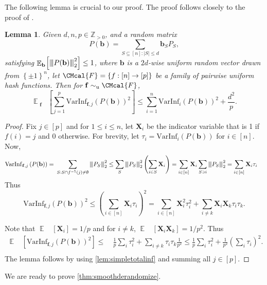 \documentclass[11pt]{article}
\def\F{\CMcal{F}}
\theoremstyle{plain}
\newtheorem{lemma}[theorem]{Lemma}
\theoremstyle{definition}
\newcommand {\minusspace} {\: \! \!}
\newcommand {\Fn} [2] {\ensuremath{ #1 \minusspace \Br{ #2 } }}
\newcommand {\set} [1] {\ensuremath{ \left\lbrace #1 \right\rbrace }}
\newcommand {\br} [1] {\ensuremath{ \left( #1 \right) }}
\newcommand {\Br} [1] {\ensuremath{ \left[ #1 \right] }}
\newcommand {\ab} [1] {\ensuremath{ \left| #1 \right| }}
\DeclareMathOperator*{\bigE}{\mathbb{E}}
\newcommand {\expec} [2] {\Fn{\bigE_{\substack{#1}}}{#2}}
\newcommand{\nnorm}[1]{{\left\vert\kern-0.25ex\left\vert\kern-0.25ex\left\vert #1
		\right\vert\kern-0.25ex\right\vert\kern-0.25ex\right\vert}}
\newcommand{\posint}{{\mathbb Z}_{>0}}
\newcommand{\randb}{\ensuremath{\mathbf{b}}}
\newcommand{\randf}{\ensuremath{\mathbf{f}}}
\newcommand{\randX}{\ensuremath{\mathbf{X}}}
\newcommand{\varinfi}[1]{\ensuremath{\mathrm{VarInf}_i}\br{#1}}
\newcommand{\infrfj}[1]{\ensuremath{\mathrm{VarInf}_{\randf,j}}\br{#1}}
\newcommand{\invf}[1]{\ensuremath{f^{-1}\br{#1}}}
\newcommand{\usim}{\ensuremath{\sim_{\mathrm{u}}}}
\newcommand{\1}{\mathbb{1}} %
\begin{document}
The following lemma is crucial to our proof. The proof follows closely to the proof of \cite[Lemma 5.4]{10.1145/1806689.1806749}.

\begin{lemma}\label{fact:totalinfsqr}
Given $d,n,p\in\posint$, and a random matrix
\[P(\randb)=\sum_{S\subseteq[n]:\ab{S}\leq d}\randb_SP_S,\]
satisfying $\expec{\randb}{\nnorm{P(\randb)}_2^2}\leq1$, 
where $\randb$ is a $2d$-wise uniform random vector drawn from $\set{\pm 1}^n$, let $\F=\set{f:[n]\to[p]}$ be a family of pairwise uniform hash functions. Then for $\randf\usim\F$,
\[\expec{\randf}{\sum_{j=1}^p\infrfj{P(\randb)}^2}\leq\sum_{i=1}^n\varinfi{P(\randb)}^2+\frac{d^2}{p}.\]
\end{lemma}

\begin{proof}
    Fix $j\in[p]$ and for $1\leq i\leq n$, let $\randX_i$ be the indicator variable that is 1 if $f(i)=j$ and 0 otherwise. For brevity, let $\tau_i=\varinfi{P(\randb)}$ for $i\in[n]$. Now,
    \begin{align*}
        \infrfj{P(\randb)}=~&\sum_{S:S\cap\invf{j}\ne\emptyset}\nnorm{P_S}_2^2
\leq\sum_{S}\nnorm{P_S}_2^2\br{\sum_{i\in S}\randX_i}
=\sum_{i\in [n]}\randX_i\sum_{S\ni i}\nnorm{P_S}_2^2
=\sum_{i\in [n]}\randX_i\tau_i
    \end{align*}
    Thus
\[\infrfj{P(\randb)}^2\leq\br{\sum_{i\in [n]}\randX_i\tau_i}^2=\sum_{i\in[n]}\randX_i^2\tau_i^2+\sum_{i\ne k}\randX_i\randX_k\tau_i\tau_k.\]

    Note that $\expec{}{\randX_i}=1/p$ and for $i\ne k$, $\expec{}{\randX_i\randX_k}=1/p^2$. Thus
    \begin{align*}
        \expec{}{\infrfj{P(\randb)}^2}\leq~&\frac{1}{p}\sum_i\tau_i^2+\sum_{i\ne k}\tau_i\tau_k\frac{1}{p^2}\leq\frac{1}{p}\sum_i\tau_i^2+\frac{1}{p^2}\br{\sum_i\tau_i}^2.\\
    \end{align*}
    The lemma follows by using \cref{lem:simpletotalinf} and summing all $j\in[p].$
\end{proof}


We are ready to prove \cref{thm:smoothderandomize}.
\end{document}
